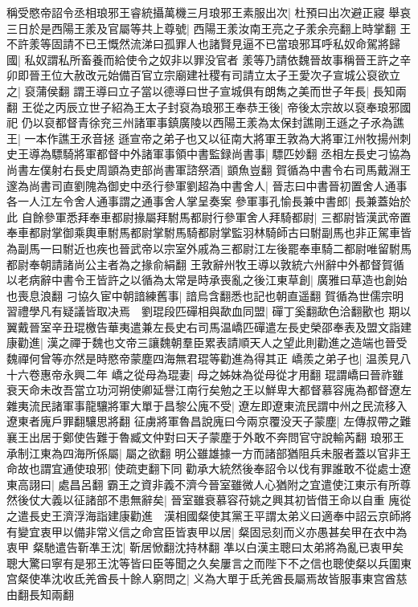 稱受愍帝詔令丞相琅邪王睿統攝萬機三月琅邪王素服出次|{
	杜預曰出次避正寢}
舉哀三日於是西陽王羕及官屬等共上尊號|{
	西陽王羕汝南王亮之子羕余亮翻上時掌翻}
王不許羕等固請不已王慨然流涕曰孤罪人也諸賢見逼不已當琅邪耳呼私奴命駕將歸國|{
	私奴謂私所畜養而給使令之奴非以罪没官者}
羕等乃請依魏晉故事稱晉王許之辛卯即晉王位大赦改元始備百官立宗廟建社稷有司請立太子王愛次子宣城公裒欲立之|{
	裒蒲侯翻}
謂王導曰立子當以德導曰世子宣城俱有朗雋之美而世子年長|{
	長知兩翻}
王從之丙辰立世子紹為王太子封裒為琅邪王奉恭王後|{
	帝後太宗故以裒奉琅邪國祀}
仍以裒都督青徐兖三州諸軍事鎮廣陵以西陽王羕為太保封譙剛王遜之子氶為譙王|{
	一本作譙王氶音拯}
遜宣帝之弟子也又以征南大將軍王敦為大將軍江州牧揚州刺史王導為驃騎將軍都督中外諸軍事領中書監録尚書事|{
	驃匹妙翻}
丞相左長史刁協為尚書左僕射右長史周顗為吏部尚書軍諮祭酒|{
	顗魚豈翻}
賀循為中書令右司馬戴淵王邃為尚書司直劉隗為御史中丞行參軍劉超為中書舍人|{
	晉志曰中書晉初置舍人通事各一人江左令舍人通事謂之通事舍人掌呈奏案}
參軍事孔愉長兼中書郎|{
	長兼蓋始於此}
自餘參軍悉拜奉車都尉掾屬拜駙馬都尉行參軍舍人拜騎都尉|{
	三都尉皆漢武帝置奉車都尉掌御乘輿車駙馬都尉掌駙馬騎都尉掌監羽林騎師古曰駙副馬也非正駕車皆為副馬一曰駙近也疾也晉武帝以宗室外戚為三都尉江左後罷奉車騎二都尉唯留駙馬都尉奉朝請諸尚公主者為之掾俞絹翻}
王敦辭州牧王導以敦統六州辭中外都督賀循以老病辭中書令王皆許之以循為太常是時承喪亂之後江東草創|{
	廣雅曰草造也創始也喪息浪翻}
刁協久宦中朝諳練舊事|{
	諳烏含翻悉也記也朝直遥翻}
賀循為世儒宗明習禮學凡有疑議皆取决焉　劉琨段匹磾相與歃血同盟|{
	磾丁奚翻歃色洽翻歠也}
期以翼戴晉室辛丑琨檄告華夷遣兼左長史右司馬温嶠匹磾遣左長史榮邵奉表及盟文詣建康勸進|{
	漢之禪于魏也文帝三讓魏朝羣臣累表請順天人之望此則勸進之造端也晉受魏禪何曾等亦然是時愍帝蒙塵四海無君琨等勸進為得其正}
嶠羨之弟子也|{
	温羨見八十六卷惠帝永興二年}
嶠之從母為琨妻|{
	母之姊妹為從母從才用翻}
琨謂嶠曰晉祚雖衰天命未改吾當立功河朔使卿延譽江南行矣勉之王以鮮卑大都督慕容廆為都督遼左雜夷流民諸軍事龍驤將軍大單于昌黎公廆不受|{
	遼左即遼東流民謂中州之民流移入遼東者廆戶罪翻驤思將翻}
征虜將軍魯昌說廆曰今兩京覆没天子蒙塵|{
	左傳叔帶之難襄王出居于鄭使告難于魯臧文仲對曰天子蒙塵于外敢不奔問官守說輸芮翻}
琅邪王承制江東為四海所係屬|{
	屬之欲翻}
明公雖雄據一方而諸部猶阻兵未服者蓋以官非王命故也謂宜通使琅邪|{
	使疏吏翻下同}
勸承大統然後奉詔令以伐有罪誰敢不從處士遼東高詡曰|{
	處昌呂翻}
霸王之資非義不濟今晉室雖微人心猶附之宜遣使江東示有所尊然後仗大義以征諸部不患無辭矣|{
	晉室雖衰慕容苻姚之興其初皆借王命以自重}
廆從之遣長史王濟浮海詣建康勸進　漢相國粲使其黨王平謂太弟义曰適奉中詔云京師將有變宜衷甲以備非常义信之命宫臣皆衷甲以居|{
	粲固忌刻而义亦愚甚矣甲在衣中為衷甲}
粲馳遣告靳凖王沈|{
	靳居惞翻沈持林翻}
凖以白漢主聰曰太弟將為亂已衷甲矣聰大驚曰寧有是邪王沈等皆曰臣等聞之久矣屢言之而陛下不之信也聰使粲以兵圍東宫粲使凖沈收氐羌酋長十餘人窮問之|{
	义為大單于氐羌酋長屬焉故皆服事東宫酋慈由翻長知兩翻}
